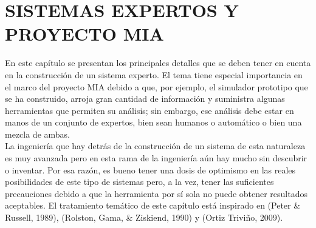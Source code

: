 \chapter{SISTEMAS EXPERTOS Y PROYECTO MIA}

\renewcommand{\thefootnote}{\arabic{footnote}}
\renewcommand{\theequation}{\arabic{chapter}-\arabic{equation}}
\renewcommand{\thefigure}{\arabic{chapter}.\arabic{figure}}
\renewcommand{\figurename}{Figura}
\renewcommand{\tablename}{\textbf{Tabla}}
\renewcommand{\thetable}{\textbf{\arabic{chapter}-\arabic{table}}}
\providecommand{\abs}[1]{\lvert#1\rvert}
\providecommand{\norm}[1]{\lVert#1\rVert}
\newpage

En este capítulo se presentan los principales detalles que se deben tener en cuenta en la construcción de un sistema experto.  El tema tiene especial importancia en el marco del proyecto MIA debido a que, por ejemplo, el simulador prototipo que se ha construido, arroja gran cantidad de información y suministra algunas herramientas que permiten su análisis; sin embargo, ese análisis debe estar en manos de un conjunto de expertos, bien sean humanos o automático o bien una mezcla de ambas.  \\
La ingeniería que hay detrás de la construcción de un sistema de esta naturaleza es muy avanzada pero en esta rama de la ingeniería  aún hay mucho sin descubrir o inventar.  Por esa razón, es bueno tener una dosis de optimismo en las reales posibilidades de este tipo de sistemas pero, a la vez, tener las suficientes precauciones debido a que la herramienta por sí sola no puede obtener resultados aceptables.  El tratamiento temático de este capítulo está inspirado en (Peter \& Russell, 1989), (Rolston, Gama, \& Ziskiend, 1990) y (Ortiz Triviño, 2009).
